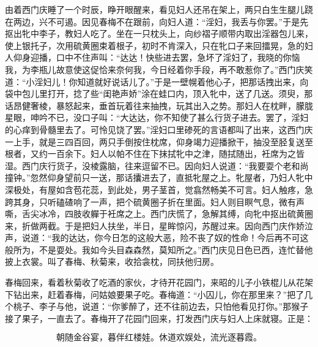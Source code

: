 由着西门庆睡了一个时辰，睁开眼醒来，看见妇人还吊在架上，两只白生生腿儿跷在两边，兴不可遏。因见春梅不在跟前，向妇人道：“淫妇，我丢与你罢。”于是先抠出牝中李子，教妇人吃了。坐在一只枕头上，向纱褶子顺带内取出淫器包儿来，使上银托子，次用硫黄圈束着根子，初时不肯深入，只在牝口子来回擂晃，急的妇人仰身迎播，口中不住声叫：“达达！快些进去罢，急坏了淫妇了，我晓的你恼我，为李瓶儿故意使这促恰来奈何我，今日经着你手段，再不敢惹你了。”西门庆笑道：“小淫妇儿！你知道就好说话儿了。”于是一壁幌着他心子，把那话拽出来，向袋中包儿里打开，捻了些“闺艳声娇”涂在蛙口内，顶入牝中，送了几送。须臾，那话昂健奢棱，暴怒起来，垂首玩着往来抽拽，玩其出入之势。那妇人在枕畔，朦胧星眼，呻吟不已，没口子叫：“大\textMaoJi \textMaoBa 达达，你不知使了甚么行货子进去。罢了，淫妇的心痒到骨髓里去了。可怜见饶了罢。”淫妇口里碜死的言语都叫了出来，这西门庆一上手，就是三四百回，两只手倒按住枕席，仰身竭力迎播掀干，抽没至胫复送至根者，又约一百余下。妇人以帕不住在下抹拭牝中之津，随拭随出，衽席为之皆湿。西门庆行货子，没棱露脑，往来逗留不已。因向妇人说道：“我要耍个老和尚撞钟。”忽然仰身望前只一送，那话攮进去了，直抵牝屋之上。牝屋者，乃妇人牝中深极处，有屋如含苞花蕊，到此处，男子茎首，觉翕然畅美不可言。妇人触疼，急跨其身，只听磕碴响了一声，把个硫黄圈子折在里面。妇人则目瞑气息，微有声嘶，舌尖冰冷，四肢收軃于衽席之上。西门庆慌了，急解其缚，向牝中抠出硫黄圈来，折做两截。于是把妇人扶坐，半日，星眸惊闪，苏醒过来。因向西门庆作娇泣声，说道：“我的达达，你今日怎的这般大恶，险不丧了奴的性命！今后再不可这般所为，不是耍处。我如今头目森森然，莫知所之。”西门庆见日色已西，连忙替他披上衣裳。叫了春梅、秋菊来，收拾衾枕，同扶他归房。

春梅回来，看着秋菊收了吃酒的家伙，才待开花园门，来昭的儿子小铁棍儿从花架下钻出来，赶着春梅，问姑娘要果子吃。春梅道：“小囚儿，你在那里来？”把了几个桃子、李子与他，说道：“你爹醉了，还不往前边去，只怕他看见打你。”那猴子接了果子，一直去了。春梅开了花园门回来，打发西门庆与妇人上床就寝。正是：

\[
朝随金谷宴，暮伴红楼娃。
休道欢娱处，流光逐暮霞。
\]
